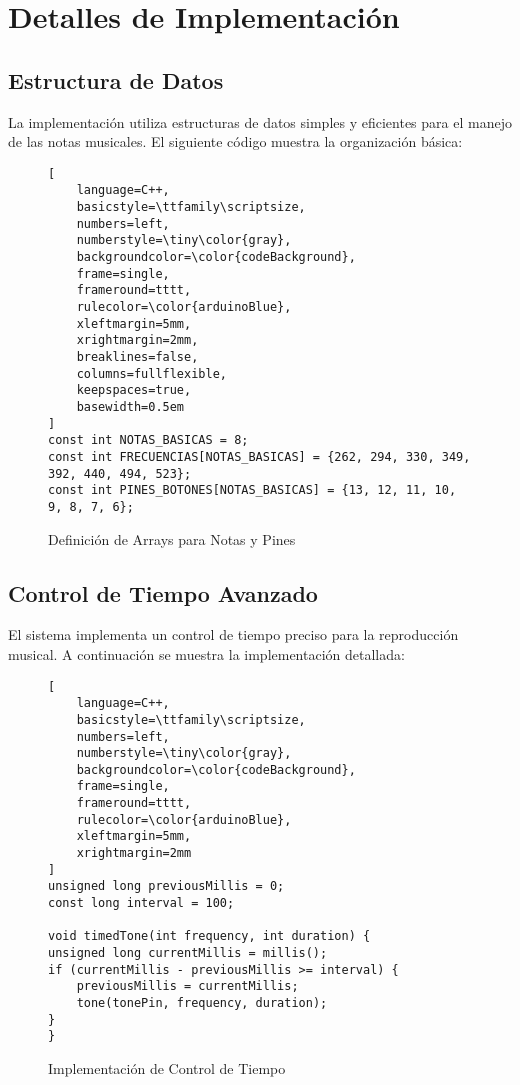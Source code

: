 \section{Detalles de Implementación}

\subsection{Estructura de Datos}
La implementación utiliza estructuras de datos simples y eficientes para el manejo de las notas musicales. El siguiente código muestra la organización básica:

\begin{figure}[H]
\centering
\begin{lstlisting}[
	language=C++,
	basicstyle=\ttfamily\scriptsize,
	numbers=left,
	numberstyle=\tiny\color{gray},
	backgroundcolor=\color{codeBackground},
	frame=single,
	frameround=tttt,
	rulecolor=\color{arduinoBlue},
	xleftmargin=5mm,
	xrightmargin=2mm,
	breaklines=false,
	columns=fullflexible,
	keepspaces=true,
	basewidth=0.5em 
]
const int NOTAS_BASICAS = 8;
const int FRECUENCIAS[NOTAS_BASICAS] = {262, 294, 330, 349, 392, 440, 494, 523};
const int PINES_BOTONES[NOTAS_BASICAS] = {13, 12, 11, 10, 9, 8, 7, 6};
\end{lstlisting}
\caption{Definición de Arrays para Notas y Pines}
\label{fig:arrays-definition}
\end{figure}

\subsection{Control de Tiempo Avanzado}
El sistema implementa un control de tiempo preciso para la reproducción musical. A continuación se muestra la implementación detallada:

\begin{figure}[H]
\centering
\begin{lstlisting}[
	language=C++,
	basicstyle=\ttfamily\scriptsize,
	numbers=left,
	numberstyle=\tiny\color{gray},
	backgroundcolor=\color{codeBackground},
	frame=single,
	frameround=tttt,
	rulecolor=\color{arduinoBlue},
	xleftmargin=5mm,
	xrightmargin=2mm
]
unsigned long previousMillis = 0;
const long interval = 100;

void timedTone(int frequency, int duration) {
unsigned long currentMillis = millis();
if (currentMillis - previousMillis >= interval) {
	previousMillis = currentMillis;
	tone(tonePin, frequency, duration);
}
}
\end{lstlisting}
\caption{Implementación de Control de Tiempo}
\label{fig:time-control}
\end{figure}

